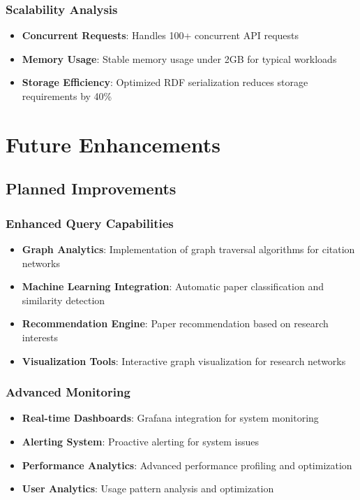 \documentclass[12pt,a4paper]{article}
\begin{document}
\subsubsection{Scalability Analysis}

\begin{itemize}
    \item \textbf{Concurrent Requests}: Handles 100+ concurrent API requests
    \item \textbf{Memory Usage}: Stable memory usage under 2GB for typical workloads
    \item \textbf{Storage Efficiency}: Optimized RDF serialization reduces storage requirements by 40\%
\end{itemize}

\section{Future Enhancements}

\subsection{Planned Improvements}

\subsubsection{Enhanced Query Capabilities}

\begin{itemize}
    \item \textbf{Graph Analytics}: Implementation of graph traversal algorithms for citation networks
    \item \textbf{Machine Learning Integration}: Automatic paper classification and similarity detection
    \item \textbf{Recommendation Engine}: Paper recommendation based on research interests
    \item \textbf{Visualization Tools}: Interactive graph visualization for research networks
\end{itemize}

\subsubsection{Advanced Monitoring}

\begin{itemize}
    \item \textbf{Real-time Dashboards}: Grafana integration for system monitoring
    \item \textbf{Alerting System}: Proactive alerting for system issues
    \item \textbf{Performance Analytics}: Advanced performance profiling and optimization
    \item \textbf{User Analytics}: Usage pattern analysis and optimization
\end{itemize}
\end{document}
